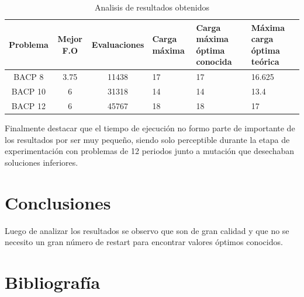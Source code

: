 \documentclass[letter, 10pt]{article}
\begin{document}
\begin{table}[h]
\centering
\caption{Analisis de resultados obtenidos}
\begin{tabular}{|c|c|c|p{2cm}|p{2cm}|p{2cm}|}
\hline 
Problema & Mejor F.O & Evaluaciones  & Carga máxima & Carga máxima óptima conocida & Máxima carga óptima teórica\tabularnewline
\hline 
\hline 
BACP 8 & 3.75 & 11438 & 17 & 17 & 16.625\tabularnewline
\hline 
BACP 10 & 6 & 31318 & 14 & 14 & 13.4\tabularnewline
\hline 
BACP 12 & 6 & 45767 & 18 & 18 & 17\tabularnewline
\hline
\end{tabular}
\end{table}

Finalmente destacar que el tiempo de ejecución no formo parte de importante de
los resultados por ser muy pequeño, siendo solo perceptible durante la etapa de
experimentación con problemas de 12 periodos junto a mutación que
desechaban soluciones inferiores.


\section{Conclusiones}
Luego de analizar los resultados se observo que son de gran calidad y que no se
necesito un gran número de restart para encontrar valores óptimos conocidos.


\section{Bibliografía}


\end{document}
